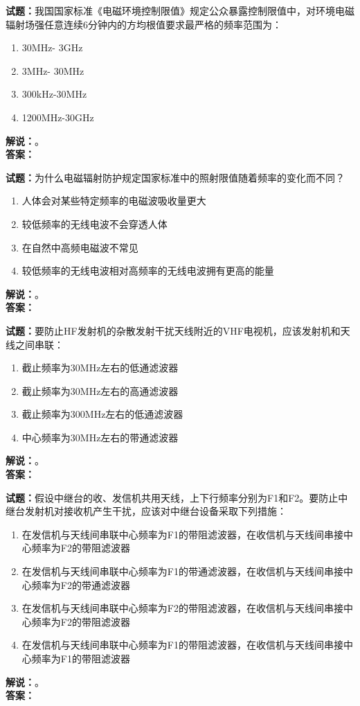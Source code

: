 \documentclass{ctexbook}
\begin{document}
\bigskip

\noindent\textbf{试题：}我国国家标准《电磁环境控制限值》规定公众暴露控制限值中，对环境电磁辐射场强任意连续6分钟内的方均根值要求最严格的频率范围为：
\begin{enumerate}[leftmargin=3em]
  \item 30\unit{\MHz}- 3\unit{\GHz}
  \item 3\unit{\MHz}- 30\unit{\MHz}
  \item 300\unit{\kHz}-30\unit{\MHz}
  \item 1200\unit{\MHz}-30\unit{\GHz}
\end{enumerate}
\noindent\textbf{解说：}\textbf{}。\\\noindent\textbf{答案：}

\bigskip

\noindent\textbf{试题：}为什么电磁辐射防护规定国家标准中的照射限值随着频率的变化而不同？
\begin{enumerate}[leftmargin=3em]
  \item 人体会对某些特定频率的电磁波吸收量更大
  \item 较低频率的无线电波不会穿透人体
  \item 在自然中高频电磁波不常见
  \item 较低频率的无线电波相对高频率的无线电波拥有更高的能量
\end{enumerate}
\noindent\textbf{解说：}\textbf{}。\\\noindent\textbf{答案：}

\bigskip

\noindent\textbf{试题：}要防止HF发射机的杂散发射干扰天线附近的VHF电视机，应该发射机和天线之间串联：
\begin{enumerate}[leftmargin=3em]
  \item 截止频率为30\unit{\MHz}左右的低通滤波器
  \item 截止频率为30\unit{\MHz}左右的高通滤波器
  \item 截止频率为300\unit{\MHz}左右的低通滤波器
  \item 中心频率为30\unit{\MHz}左右的带通滤波器
\end{enumerate}
\noindent\textbf{解说：}\textbf{}。\\\noindent\textbf{答案：}

\bigskip

\noindent\textbf{试题：}假设中继台的收、发信机共用天线，上下行频率分别为F1和F2。要防止中继台发射机对接收机产生干扰，应该对中继台设备采取下列措施：
\begin{enumerate}[leftmargin=3em]
  \item 在发信机与天线间串联中心频率为F1的带阻滤波器，在收信机与天线间串接中心频率为F2的带阻滤波器
  \item 在发信机与天线间串联中心频率为F1的带通滤波器，在收信机与天线间串接中心频率为F2的带通滤波器
  \item 在发信机与天线间串联中心频率为F2的带阻滤波器，在收信机与天线间串接中心频率为F2的带阻滤波器
  \item 在发信机与天线间串联中心频率为F1的带阻滤波器，在收信机与天线间串接中心频率为F1的带阻滤波器
\end{enumerate}
\noindent\textbf{解说：}\textbf{}。\\\noindent\textbf{答案：}
\end{document}
